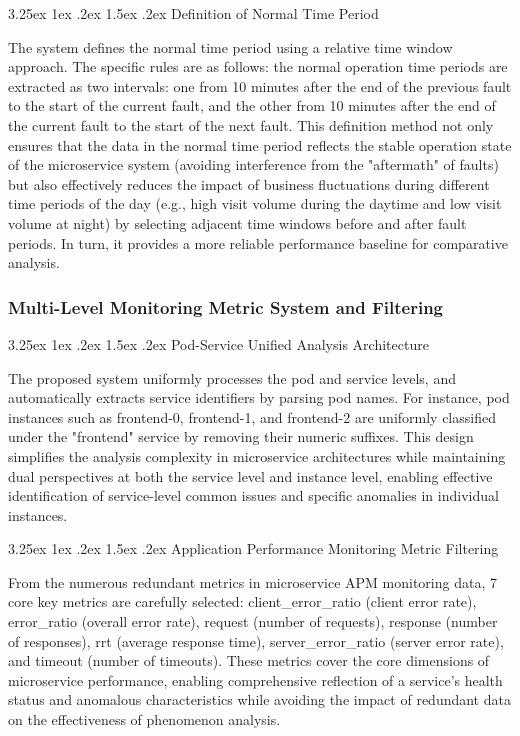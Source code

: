 \documentclass[10pt]{article}
\makeatletter
\renewcommand{\paragraph}{%
    \@startsection{paragraph}{4}{\z@}%
    {3.25ex \@plus1ex \@minus.2ex}%
    {1.5ex \@plus.2ex}%
    {\normalfont\normalsize\itshape}%
}
\makeatother
\begin{document}
\paragraph{Definition of Normal Time Period}

The system defines the normal time period using a relative time window approach. The specific rules are as follows: the normal operation time periods are extracted as two intervals: one from 10 minutes after the end of the previous fault to the start of the current fault, and the other from 10 minutes after the end of the current fault to the start of the next fault. This definition method not only ensures that the data in the normal time period reflects the stable operation state of the microservice system (avoiding interference from the "aftermath" of faults) but also effectively reduces the impact of business fluctuations during different time periods of the day (e.g., high visit volume during the daytime and low visit volume at night) by selecting adjacent time windows before and after fault periods. In turn, it provides a more reliable performance baseline for comparative analysis.

\subsubsection{Multi-Level Monitoring Metric System and Filtering}

\paragraph{Pod-Service Unified Analysis Architecture}

The proposed system uniformly processes the pod and service levels, and automatically extracts service identifiers by parsing pod names. For instance, pod instances such as frontend-0, frontend-1, and frontend-2 are uniformly classified under the "frontend" service by removing their numeric suffixes. This design simplifies the analysis complexity in microservice architectures while maintaining dual perspectives at both the service level and instance level, enabling effective identification of service-level common issues and specific anomalies in individual instances.

\paragraph{Application Performance Monitoring Metric Filtering}

From the numerous redundant metrics in microservice APM monitoring data, 7 core key metrics are carefully selected: client\_error\_ratio (client error rate), error\_ratio (overall error rate), request (number of requests), response (number of responses), rrt (average response time), server\_error\_ratio (server error rate), and timeout (number of timeouts). These metrics cover the core dimensions of microservice performance, enabling comprehensive reflection of a service’s health status and anomalous characteristics while avoiding the impact of redundant data on the effectiveness of phenomenon analysis.
\end{document}
